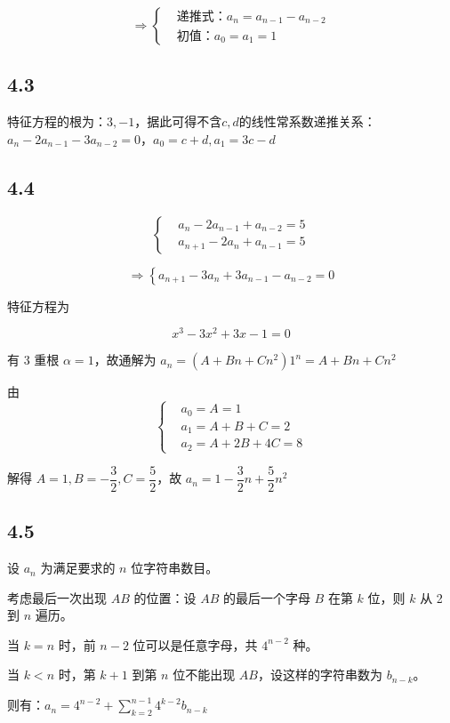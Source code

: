 \documentclass{article}
\begin{document}
\[
\Rightarrow
\left\{
\begin{aligned}
&\text{递推式：}a_n=a_{n-1}-a_{n-2} \\
&\text{初值：}a_0 = a_1 = 1
\end{aligned}
\right.
\]

\subsection*{4.3}

特征方程的根为：$3,-1$，据此可得不含$c,d$的线性常系数递推关系：$a_n-2a_{n-1}-3a_{n-2}=0$，$a_0=c+d,a_1=3c-d$

\subsection*{4.4}

\[
\left\{
\begin{aligned}
&a_n-2a_{n-1}+a_{n-2}=5 \\
&a_{n+1}-2a_n+a_{n-1}=5
\end{aligned}
\right.
\]

\[
\Rightarrow
\left\{
a_{n+1}-3a_n+3a_{n-1}-a_{n-2}=0
\right.
\]

特征方程为

\[
x^3-3x^2+3x-1=0
\]

有 3 重根 $\alpha=1$，故通解为 $a_n=(A+Bn+Cn^2)1^n=A+Bn+Cn^2$

由
\[
\left\{
\begin{aligned}
&a_0=A=1 \\
&a_1=A+B+C=2 \\
&a_2=A+2B+4C=8
\end{aligned}
\right.
\]

解得 $A=1,B=-\dfrac{3}{2},C=\dfrac{5}{2}$，故 $a_n=1-\dfrac{3}{2}n+\dfrac{5}{2}n^2$

\subsection*{4.5}

设 $a_n$ 为满足要求的 $n$ 位字符串数目。

考虑最后一次出现 $AB$ 的位置：设 $AB$ 的最后一个字母 $B$ 在第 $k$ 位，则 $k$ 从 2 到 $n$ 遍历。

当 $k=n$ 时，前 $n-2$ 位可以是任意字母，共 $4^{n-2}$ 种。

当 $k<n$ 时，第 $k+1$ 到第 $n$ 位不能出现 $AB$，设这样的字符串数为 $b_{n-k}$。

则有：$a_n=4^{n-2}+\sum_{k=2}^{n-1}4^{k-2}b_{n-k}$
\end{document}
